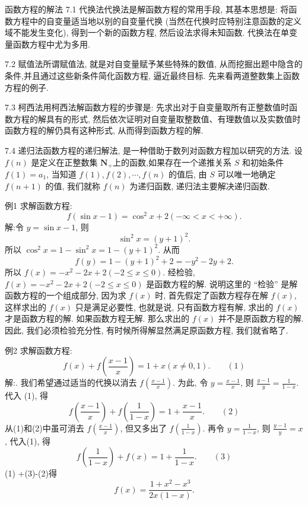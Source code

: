 
函数方程的解法 
7.1 代换法代换法是解函数方程的常用手段, 其基本思想是: 将函数方程中的自变量适当地以别的自变量代换 (当然在代换时应特别注意函数的定义域不能发生变化), 得到一个新的函数方程, 然后设法求得未知函数.
代换法在单变量函数方程中尤为多用.



7.2 赋值法所谓赋值法, 就是对自变量赋予某些特殊的数值, 从而挖掘出题中隐含的条件,并且通过这些新条件简化函数方程, 逼近最终目标.
先来看两道整数集上函数方程的例子.



7.3 柯西法用柯西法解函数方程的步骤是: 先求出对于自变量取所有正整数值时函数方程的解具有的形式, 然后依次证明对自变量取整数值、有理数值以及实数值时函数方程的解仍具有这种形式, 从而得到函数方程的解.



7.4 递归法函数方程的递归解法, 是一种借助于数列对函数方程加以研究的方法.
设 $f(n)$ 是定义在正整数集 $\mathbf{N}_{+}$上的函数,如果存在一个递推关系 $S$ 和初始条件 $f(1)=a_1$, 当知道 $f(1), f(2), \cdots, f(n)$ 的值后, 由 $S$ 可以唯一地确定 $f(n+1)$ 的值, 我们就称 $f(n)$ 为递归函数, 递归法主要解决递归函数.



例1 求解函数方程:
$$
f(\sin x-1)=\cos ^2 x+2(-\infty<x<+\infty) .
$$
解:令 $y=\sin x-1$, 则
$$
\sin ^2 x=(y+1)^2 .
$$
所以 $\cos ^2 x=1-\sin ^2 x=1-(y+1)^2$.
从而
$$
f(y)=1-(y+1)^2+2=-y^2-2 y+2 .
$$
所以 $f(x)=-x^2-2 x+2(-2 \leqslant x \leqslant 0)$.
经检验, $f(x)=-x^2-2 x+2(-2 \leqslant x \leqslant 0)$ 是函数方程的解.
说明这里的 “检验” 是解函数方程的一个组成部分, 因为求 $f(x)$ 时, 首先假定了函数方程存在解 $f(x)$, 这样求出的 $f(x)$ 只是满足必要性, 也就是说, 只有函数方程有解, 求出的 $f(x)$ 才是函数方程的解.
如果函数方程无解.
那么求出的 $f(x)$ 并不是原函数方程的解.
因此, 我们必须检验充分性, 有时候所得解显然满足原函数方程, 我们就省略了.



例2 求解函数方程:
$$
f(x)+f\left(\frac{x-1}{x}\right)=1+x(x \neq 0,1) . \quad\quad (1)
$$
解:.
我们希望通过适当的代换以消去 $f\left(\frac{x-1}{x}\right)$. 为此, 令 $y=\frac{x-1}{x}$, 则 $\frac{y-1}{y}=\frac{1}{1-x}$. 代入 (1), 得
$$
f\left(\frac{x-1}{x}\right)+f\left(\frac{1}{1-x}\right)=1+\frac{x-1}{x} . \quad\quad (2)
$$
从(1)和(2)中虽可消去 $f\left(\frac{x-1}{x}\right)$, 但又多出了 $f\left(\frac{1}{1-x}\right)$.
再令 $y=\frac{1}{1-x}$, 则 $\frac{y-1}{y}=x$, 代入(1), 得
$$
f\left(\frac{1}{1-x}\right)+f(x)=1+\frac{1}{1-x}. \quad\quad (3)
$$
(1) +(3)-(2)得
$$
f(x)=\frac{1+x^2-x^3}{2 x(1-x)} .
$$




